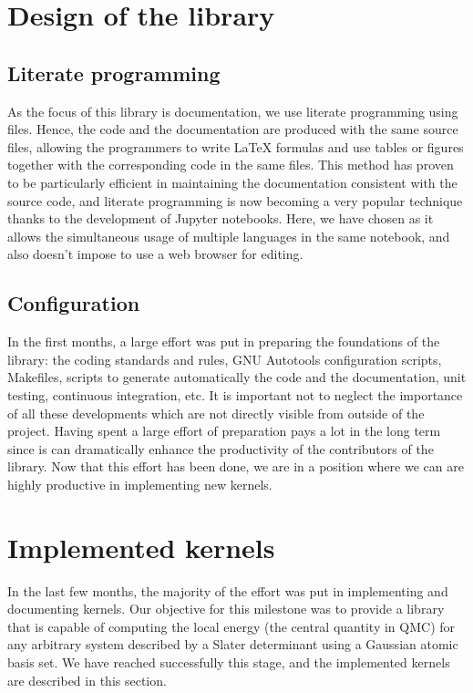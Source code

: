 \section{Design of the library}

\subsection{Literate programming}

As the focus of this library is documentation, we use literate
programming using {\orgmode} files.\cite{schulte_2012,orgmode}
Hence, the code and the documentation are produced with the same
source files, allowing the programmers to write \LaTeX{} formulas and
use tables or figures together with the corresponding code in the same
files.
This method has proven to be particularly efficient in maintaining the
documentation consistent with the source code, and literate
programming is now becoming a very popular technique thanks to the
development of Jupyter notebooks.
Here, we have chosen {\orgmode} as it allows the simultaneous usage of
multiple languages in the same notebook, and also doesn't impose to
use a web browser for editing.

\subsection{Configuration}

In the first months, a large effort was put in preparing the
foundations of the library: the coding standards and rules, GNU Autotools
configuration scripts, Makefiles, scripts to generate automatically
the code and the documentation, unit testing, continuous integration,
etc. It is important not to neglect the importance of all these
developments which are not directly visible from outside of the project.
Having spent a large effort of preparation pays a lot in the long term
since is can dramatically enhance the productivity of the contributors
of the library.
Now that this effort has been done, we are in a position where we can
are highly productive in implementing new kernels.

\section{Implemented kernels}

In the last few months, the majority of the effort was put in
implementing and documenting kernels. Our objective for this milestone
was to provide a library that is capable of computing the local energy
(the central quantity in \ac{QMC}) for any arbitrary system described
by a Slater determinant using a Gaussian atomic basis set. We have
reached successfully this stage, and the implemented kernels are
described in this section.

